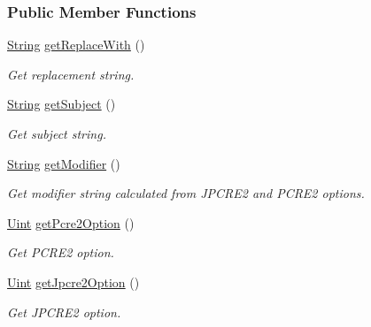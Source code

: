 \subsubsection*{Public Member Functions}
\begin{DoxyCompactItemize}
\item 
\hyperlink{namespacejpcre2_a91f03070152fb228bc116c5a737f1d16}{String} \hyperlink{classjpcre2_1_1RegexReplace_a7376993ef78e78950a44780417987640_a7376993ef78e78950a44780417987640}{get\+Replace\+With} ()
\begin{DoxyCompactList}\small\item\em Get replacement string. \end{DoxyCompactList}\item 
\hyperlink{namespacejpcre2_a91f03070152fb228bc116c5a737f1d16}{String} \hyperlink{classjpcre2_1_1RegexReplace_a747ec0bd529b8dd49d2db30c75786026_a747ec0bd529b8dd49d2db30c75786026}{get\+Subject} ()
\begin{DoxyCompactList}\small\item\em Get subject string. \end{DoxyCompactList}\item 
\hyperlink{namespacejpcre2_a91f03070152fb228bc116c5a737f1d16}{String} \hyperlink{classjpcre2_1_1RegexReplace_a4c325837716be3a48e2f92a80790d49f_a4c325837716be3a48e2f92a80790d49f}{get\+Modifier} ()
\begin{DoxyCompactList}\small\item\em Get modifier string calculated from J\+P\+C\+R\+E2 and P\+C\+R\+E2 options. \end{DoxyCompactList}\item 
\hyperlink{namespacejpcre2_a078242d38221a13fb3543b9edd78c099}{Uint} \hyperlink{classjpcre2_1_1RegexReplace_ac9e158fa5dc0c4d8b27e2dd694e7bc84_ac9e158fa5dc0c4d8b27e2dd694e7bc84}{get\+Pcre2\+Option} ()
\begin{DoxyCompactList}\small\item\em Get P\+C\+R\+E2 option. \end{DoxyCompactList}\item 
\hyperlink{namespacejpcre2_a078242d38221a13fb3543b9edd78c099}{Uint} \hyperlink{classjpcre2_1_1RegexReplace_addc36e1c991b639d549a32d1151c04df_addc36e1c991b639d549a32d1151c04df}{get\+Jpcre2\+Option} ()
\begin{DoxyCompactList}\small\item\em Get J\+P\+C\+R\+E2 option. \end{DoxyCompactList}\item 

\end{DoxyCompactItemize}
